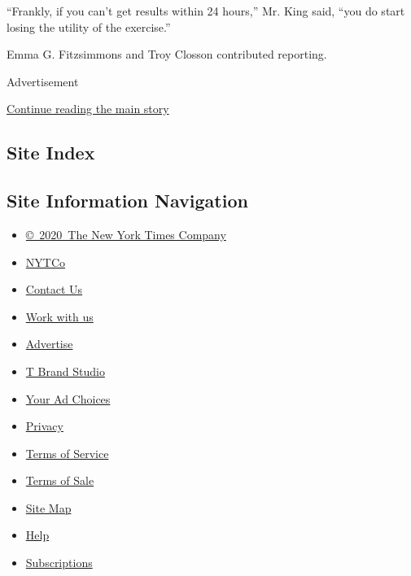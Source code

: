 ``Frankly, if you can't get results within 24 hours,'' Mr. King said,
``you do start losing the utility of the exercise.''

Emma G. Fitzsimmons and Troy Closson contributed reporting.

Advertisement

\protect\hyperlink{after-bottom}{Continue reading the main story}

\hypertarget{site-index}{%
\subsection{Site Index}\label{site-index}}

\hypertarget{site-information-navigation}{%
\subsection{Site Information
Navigation}\label{site-information-navigation}}

\begin{itemize}
\tightlist
\item
  \href{https://help.nytimes3xbfgragh.onion/hc/en-us/articles/115014792127-Copyright-notice}{©~2020~The
  New York Times Company}
\end{itemize}

\begin{itemize}
\tightlist
\item
  \href{https://www.nytco.com/}{NYTCo}
\item
  \href{https://help.nytimes3xbfgragh.onion/hc/en-us/articles/115015385887-Contact-Us}{Contact
  Us}
\item
  \href{https://www.nytco.com/careers/}{Work with us}
\item
  \href{https://nytmediakit.com/}{Advertise}
\item
  \href{http://www.tbrandstudio.com/}{T Brand Studio}
\item
  \href{https://www.nytimes3xbfgragh.onion/privacy/cookie-policy\#how-do-i-manage-trackers}{Your
  Ad Choices}
\item
  \href{https://www.nytimes3xbfgragh.onion/privacy}{Privacy}
\item
  \href{https://help.nytimes3xbfgragh.onion/hc/en-us/articles/115014893428-Terms-of-service}{Terms
  of Service}
\item
  \href{https://help.nytimes3xbfgragh.onion/hc/en-us/articles/115014893968-Terms-of-sale}{Terms
  of Sale}
\item
  \href{https://spiderbites.nytimes3xbfgragh.onion}{Site Map}
\item
  \href{https://help.nytimes3xbfgragh.onion/hc/en-us}{Help}
\item
  \href{https://www.nytimes3xbfgragh.onion/subscription?campaignId=37WXW}{Subscriptions}
\end{itemize}

